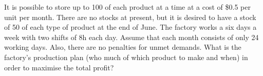 It is possible to store up to 100 of each product at a time at a cost of \$0.5
per unit per month. There are no stocks at present, but it is desired to have a
stock of 50 of each type of product at the end of June.
The factory works a six days a week with two shifts of 8h each day. Assume that each month consists of only 24 working days. Also, 
there are no penalties for unmet demands. What is the factory's production plan (who much of which product to make and when) in order to 
maximise the total profit?

